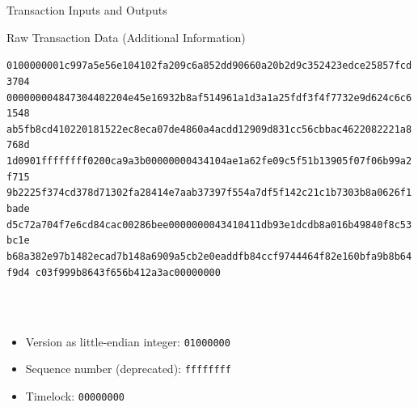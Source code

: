 \documentclass[]{beamer}
\begin{document}
\begin{frame}{Transaction Inputs and Outputs}
	\begin{figure}
			
	\end{figure}

\end{frame}




\begin{frame}{Raw Transaction Data (Additional Information)}
\begin{scriptsize}
\texttt{\alert<1>{01000000}\textcolor{black!50}{01c997a5e56e104102fa209c6a852dd90660a20b2d9c352423edce25857fcd3704
000000004847304402204e45e16932b8af514961a1d3a1a25fdf3f4f7732e9d624c6c61548
ab5fb8cd410220181522ec8eca07de4860a4acdd12909d831cc56cbbac4622082221a8768d
1d0901}\alert<2>{ffffffff}\textcolor{black!50}{0200ca9a3b00000000434104ae1a62fe09c5f51b13905f07f06b99a2f715
9b2225f374cd378d71302fa28414e7aab37397f554a7df5f142c21c1b7303b8a0626f1bade
d5c72a704f7e6cd84cac00286bee0000000043410411db93e1dcdb8a016b49840f8c53bc1e
b68a382e97b1482ecad7b148a6909a5cb2e0eaddfb84ccf9744464f82e160bfa9b8b64f9d4
c03f999b8643f656b412a3ac}\alert<3>{00000000}}
\vspace{1em}
\end{scriptsize}
\scriptsize \\
\\
\begin{itemize}
	\item \alert<1>{Version as little-endian integer: \texttt{01000000}}
	\item \alert<2>{Sequence number (deprecated): \texttt{ffffffff}}
	\item \alert<3>{Timelock: \texttt{00000000}}
\end{itemize}
\end{frame}
\end{document}
